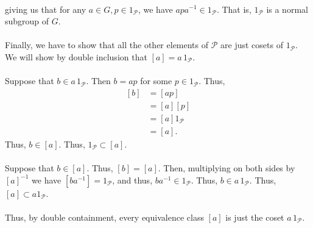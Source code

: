 \documentclass[12 pt, letterpaper]{hmcpset}
\begin{document}
\begin{solution}
\[\begin{split}
		\end{split}
	\]
	giving us that for any $a \in G, p \in 1_{\mathcal{P}}$, we have $apa^{-1} \in 1_{\mathcal{P}}$. That is, $1_{\mathcal{P}}$ is a normal subgroup of $G$. \\\\
	Finally, we have to show that all the other elements of $\mathcal{P}$ are just cosets of $1_{\mathcal{P}}$. We will show by double inclusion that $[a] = a \, 1_{\mathcal{P}}$. \\\\
	Suppose that $b \in a \, 1_{\mathcal{P}}$. Then $b = a p$ for some $p \in 1_{\mathcal{P}}$. Thus,
	\[
		\begin{split}
			[b] & = [ap] \\
			    & = [a][p] \\
			    & = [a] 1_{\mathcal{P}} \\
			    & = [a].
		\end{split}
	\]
	Thus, $b \in [a]$. Thus, $1_{\mathcal{P}} \subset [a]$. \\\\
	Suppose that $b \in [a]$. Thus, $[b] = [a]$. Then, multiplying on both sides by $[a]^{-1}$ we have $[ba^{-1}] = 1_{\mathcal{P}}$, and thus, $ba^{-1} \in 1_{\mathcal{P}}$. Thus, $b \in a \, 1_{\mathcal{P}}$. Thus, $[a] \subset a 1_{\mathcal{P}}$. \\\\
	Thus, by double containment, every equivalence class $[a]$ is just the coset $a \, 1_{\mathcal{P}}$.
\end{solution}
\end{document}
